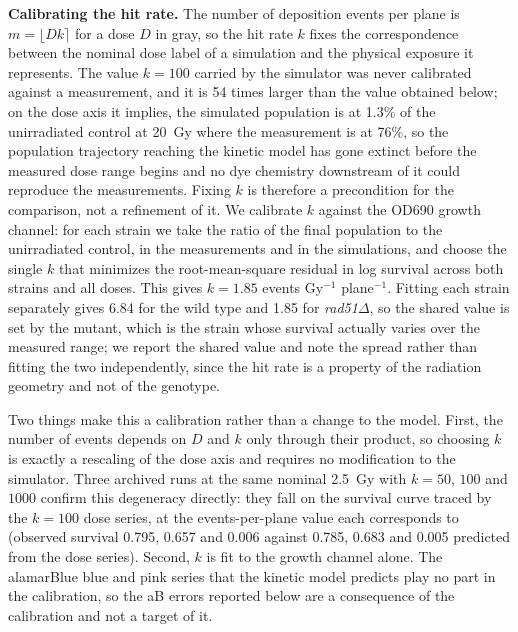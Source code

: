 \documentclass[11pt]{article}
\begin{document}
\textbf{Calibrating the hit rate.} The number of deposition events per plane is
$m = \lfloor D k \rceil$ for a dose $D$ in gray, so the hit rate $k$ fixes the
correspondence between the nominal dose label of a simulation and the physical
exposure it represents. The value $k = 100$ carried by the simulator was never
calibrated against a measurement, and it is 54 times larger than the value
obtained below; on the dose axis it implies, the simulated population is at 1.3\%
of the unirradiated control at 20~Gy where the measurement is at 76\%,
so the population trajectory reaching the kinetic model has
gone extinct before the measured dose range begins and no dye chemistry downstream
of it could reproduce the measurements. Fixing $k$ is therefore a precondition for
the comparison, not a refinement of it. We calibrate $k$ against the OD690 growth
channel: for
each strain we take the ratio of the final population to the unirradiated control,
in the measurements and in the simulations, and choose the single $k$ that
minimizes the root-mean-square residual in log survival across both strains and
all doses. This gives $k = 1.85$ events Gy$^{-1}$ plane$^{-1}$.
Fitting each strain separately gives 6.84 for the wild type
and 1.85 for \textit{rad51}$\Delta$, so the shared value is set by the mutant,
which is the strain whose survival actually varies over the measured range; we
report the shared value and note the spread rather than fitting the two
independently, since the hit rate is a property of the radiation geometry and not
of the genotype.

Two things make this a calibration rather than a change to the model. First, the
number of events depends on $D$ and $k$ only through their product, so choosing
$k$ is exactly a rescaling of the dose axis and requires no modification to the
simulator. Three archived runs at the same nominal 2.5~Gy with $k = 50$, $100$ and
$1000$ confirm this degeneracy directly: they fall on the survival curve traced by
the $k = 100$ dose series, at the events-per-plane value each corresponds to
(observed survival 0.795, 0.657 and 0.006 against 0.785, 0.683
and 0.005 predicted from the dose series). Second, $k$ is fit to the growth channel
alone. The alamarBlue blue and pink series that the kinetic model predicts play no
part in the calibration, so the aB errors reported below are a consequence of the
calibration and not a target of it.
\end{document}

